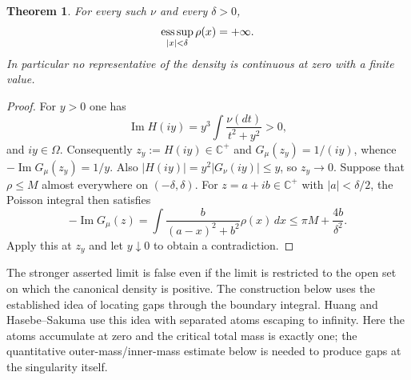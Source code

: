 \documentclass[11pt,a4paper]{article}
\newtheorem{theorem}{Theorem}[section]
\numberwithin{equation}{section}
\begin{document}
\begin{theorem}\label{thm:critical-unboundedness}
For every such $\nu$ and every $\delta>0$,
\[
 \mathop{\rm ess\,sup}_{|x|<\delta}\rho(x)=+\infty.
\]
In particular no representative of the density is continuous at zero
with a finite value.
\end{theorem}
\begin{proof}
For $y>0$ one has
\[
 \operatorname{Im}H(iy)=y^3\int\frac{\nu(dt)}{t^2+y^2}>0,
\]
and $iy\in\Omega$.  Consequently $z_y:=H(iy)\in\mathbb C^+$ and
$G_\mu(z_y)=1/(iy)$, whence $-\operatorname{Im}G_\mu(z_y)=1/y$.
Also $|H(iy)|=y^2|G_\nu(iy)|\le y$, so $z_y\to0$.
Suppose that $\rho\le M$ almost everywhere on $(-\delta,\delta)$.
For $z=a+ib\in\mathbb C^+$ with $|a|<\delta/2$, the Poisson integral
then satisfies
\[
 -\operatorname{Im}G_\mu(z)
 =\int\frac{b}{(a-x)^2+b^2}\rho(x)\,dx
 \le \pi M+\frac{4b}{\delta^2}.
\]
Apply this at $z_y$ and let $y\downarrow0$ to obtain a contradiction.
\end{proof}

The stronger asserted limit is false even if the limit is restricted to
the open set on which the canonical density is positive.
The construction below uses the established idea of locating gaps through
the boundary integral.  Huang \cite[Proposition 4.13]{Huang15} and Hasebe--Sakuma \cite[Example 5.3]{HS} use this idea with separated atoms
escaping to infinity.  Here the atoms accumulate at zero and the critical
total mass is exactly one; the quantitative outer-mass/inner-mass estimate
below is needed to produce gaps at the singularity itself.
\end{document}
